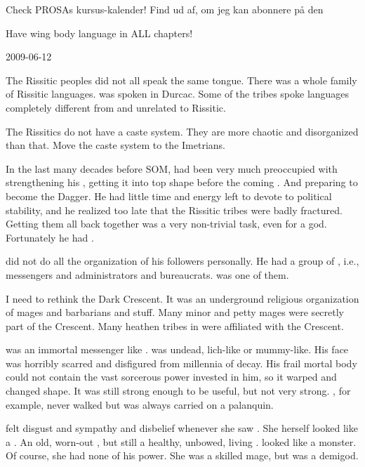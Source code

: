 Check PROSAs kursus-kalender!
Find ud af, om jeg kan abonnere på den 

Have wing body language in ALL \resphan chapters!



2009-06-12

The Rissitic peoples did not all speak the same tongue.
There was a whole family of Rissitic languages. 
 was spoken in Durcac.
Some of the tribes spoke languages completely different from and unrelated to Rissitic.

The Rissitics do not have a caste system. 
They are more chaotic and disorganized than that.
Move the caste system to the Imetrians.

In the last many decades before SOM, \Secherdamon had been very much preoccupied with strengthening his \matrix, getting it into top shape before the coming \thirdbanewar.
And preparing \Vizsherioch to become the Dagger. 
He had little time and energy left to devote to political stability, and he realized too late that the Rissitic tribes were badly fractured.
Getting them all back together was a very non-trivial task, even for a god. 
Fortunately he had \Narkiza. 

\Secherdamon did not do all the organization of his followers personally.
He had a group of , i.e., messengers and administrators and bureaucrats.
\LocarPsyrex was one of them.

I need to rethink the Dark Crescent. 
It was an underground religious organization of mages and barbarians and stuff.
Many minor \rethyaxes and petty mages were secretly part of the Crescent.
Many heathen tribes in \Velcad were affiliated with the Crescent.

\TessHaanith was an immortal messenger like \LocarPsyrex. 
\Psyrex was undead, lich-like or mummy-like. 
His face was horribly scarred and disfigured from millennia of decay.
His frail mortal body could not contain the vast sorcerous power invested in him, so it warped and changed shape.
It was still strong enough to be useful, but not very strong.
\TessHaanith, for example, never walked but was always carried on a palanquin. 

\Criseis felt disgust and sympathy and disbelief whenever she saw \Psyrex.
She herself looked like a \scatha. 
An old, worn-out \scatha, but still a healthy, unbowed, living \scatha.
\Psyrex looked like a monster.
Of course, she had none of his power.
She was a skilled mage, but \Psyrex was a demigod.

